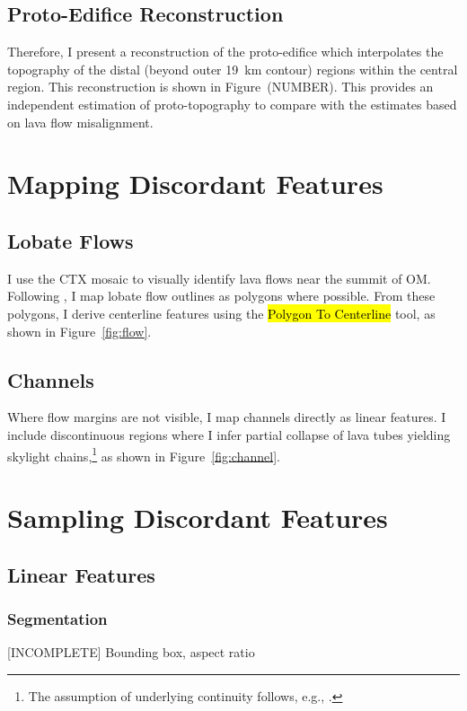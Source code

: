 \subsection{Proto-Edifice Reconstruction}
Therefore, I present a reconstruction of the proto-edifice which interpolates the topography of the distal (beyond outer \qty{19}{\km} contour) regions within the central region. This reconstruction is shown in Figure~(NUMBER). This provides an independent estimation of proto-topography to compare with the estimates based on lava flow misalignment.

\section{Mapping Discordant Features}\label{sec:mapping}

\subsection{Lobate Flows}
I use the \ac{CTX} mosaic to visually identify lava flows near the summit of \ac{OM}. Following \textcite{mouginis-mark_geologic_2021}, I map lobate flow outlines as polygons where possible. From these polygons, I derive centerline features using the \hl{Polygon To Centerline} tool, as shown in Figure~\ref{fig:flow}.

\subsection{Channels}

Where flow margins are not visible, I map channels directly as linear features. I include discontinuous regions where I infer partial collapse of lava tubes yielding skylight chains,\footnote{The assumption of underlying continuity follows, e.g., \textcite{bleacher_olympus_2007,carr_geologic_2010,peters_lava_2021}.} as shown in Figure~\ref{fig:channel}.

\section{Sampling Discordant Features}

\subsection{Linear Features}

\subsubsection{Segmentation}
[INCOMPLETE] Bounding box, aspect ratio

